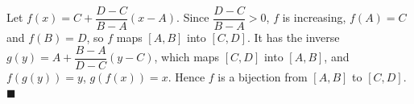 Let $f(x)=C+\dfrac{D-C}{B-A}(x-A)$. Since $\dfrac{D-C}{B-A}>0$, $f$ is increasing, $f(A)=C$ and $f(B)=D$, so $f$ maps $[A,B]$ into $[C,D]$. It has the inverse $g(y)=A+\dfrac{B-A}{D-C}(y-C)$, which maps $[C,D]$ into $[A,B]$, and $f(g(y))=y$, $g(f(x))=x$. Hence $f$ is a bijection from $[A,B]$ to $[C,D]$. $\blacksquare$
